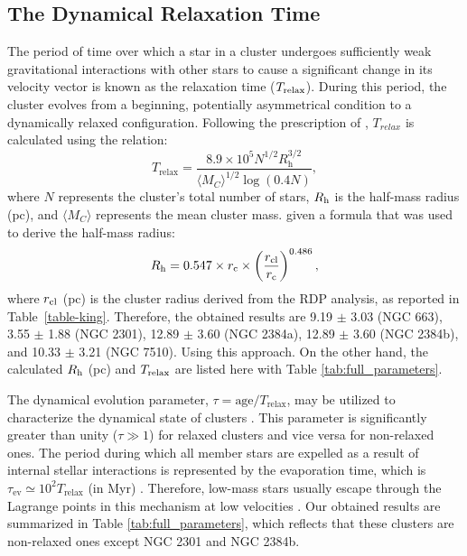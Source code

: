 \documentclass[referee]{raa}            %
\begin{document}
\subsection{The Dynamical Relaxation Time}
\label{sec:dynamic and kinematic}
The period of time over which a star in a cluster undergoes sufficiently weak gravitational interactions with other stars to cause a significant change in its velocity vector is known as the relaxation time ($T_{\rm relax}$). During this period, the cluster evolves from a beginning, potentially asymmetrical condition to a dynamically relaxed configuration. Following the prescription of \citet{Spitzer1971}, $T_{relax}$ is calculated using the relation:
\begin{equation}
\label{Eq: t_relax}
T_\text{relax} = \frac{8.9 \times 10^5 N^{1/2} R_\text{h}^{3/2}}{\langle M_C \rangle^{1/2} \log(0.4N)},
\end{equation}
where $N$ represents the cluster's total number of stars, $R_{\rm h}$ is the half-mass radius (pc), and $\langle M_C \rangle$ represents the mean cluster mass. \citet{Sableviciute_2006} given a formula that was used to derive the half-mass radius:
\begin{equation}
R_{\rm h} = 0.547 \times r_{\rm c} \times \left( \frac{r_{\rm cl}}{r_{\rm c}} \right)^{0.486},
\end{equation}
where $r_{\rm cl}$ (pc) is the cluster radius derived from the RDP analysis, as reported in Table~\ref{table-king}. Therefore, the obtained results are 9.19 $\pm$ 3.03 (NGC 663), 3.55 $\pm$ 1.88 (NGC 2301), 12.89 $\pm$ 3.60 (NGC 2384a), 12.89 $\pm$ 3.60 (NGC 2384b), and 10.33 $\pm$ 3.21 (NGC 7510). Using this approach. On the other hand, the calculated $R_{\rm h}$ (pc) and $T_{\rm relax}$ are listed here with Table \ref{tab:full_parameters}.

The dynamical evolution parameter, $\tau = \text{age} / T_{\text{relax}} $, may be utilized to characterize the dynamical state of clusters \citep{Bisht2021}. This parameter is significantly greater than unity ($ \tau \gg 1 $) for relaxed clusters and vice versa for non-relaxed ones. The period during which all member stars are expelled as a result of internal stellar interactions is represented by the evaporation time, which is $ \tau_{\text{ev}} \simeq 10^2 T_{\text{relax}}$ (in Myr) \citep{2001ApJ...553..744A}. Therefore, low-mass stars usually escape through the Lagrange points in this mechanism at low velocities \citep{koposov2008}. Our obtained results are summarized in Table \ref{tab:full_parameters}, which reflects that these clusters are non-relaxed ones except NGC 2301 and NGC 2384b.
\end{document}
